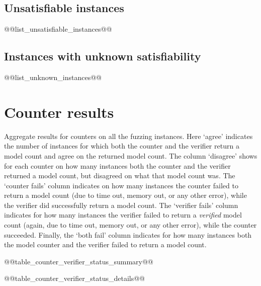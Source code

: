 \documentclass[british]{article}
\begin{document}
\subsection{Unsatisfiable instances}
\label{subsec:unsatisfiable-instances}

@@list_unsatisfiable_instances@@


\subsection{Instances with unknown satisfiability}
\label{subsec:unknown-instances}

@@list_unknown_instances@@


\section{Counter results}
\label{sec:counter-results}

\begin{table}[ht]
    \begin{center}
    \caption{Aggregate results for counters on all the fuzzing instances. Here `agree' indicates the number of instances for which both the counter and the verifier return a model count and agree on the returned model count. The column `disagree' shows for each counter on how many instances both the counter and the verifier returned a model count, but disagreed on what that model count was. The `counter fails' column indicates on how many instances the counter failed to return a model count (due to time out, memory out, or any other error), while the verifier did successfully return a model count. The `verifier fails' column indicates for how many instances the verifier failed to return a {\em verified} model count (again, due to time out, memory out, or any other error), while the counter succeeded. Finally, the `both fail' column indicates for how many instances both the model counter and the verifier failed to return a model count.}
    \label{tab:counter-verifier-status-summary}
@@table_counter_verifier_status_summary@@
    \end{center}
\end{table}

\newpage
\begin{landscape}
@@table_counter_verifier_status_details@@
\end{landscape}


\printbibliography
\end{document}
